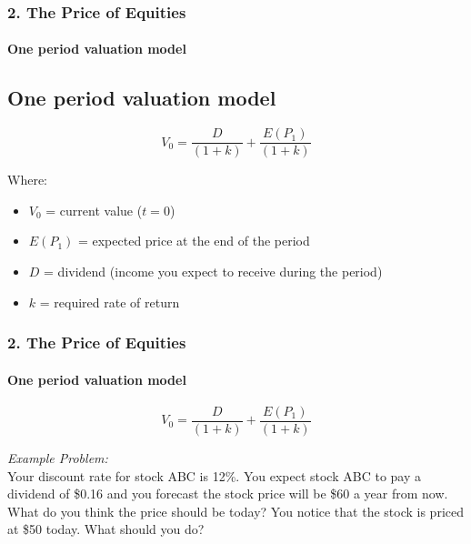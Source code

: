 \documentclass{beamer}
\begin{document}
\begin{frame}[t]
    \frametitle{2. The Price of Equities}
    \framesubtitle{One period valuation model}
    \subsection{One period valuation model}

    $$
    V_0 = \frac{D}{(1+k)} + \frac{E(P_1)}{(1+k)}
    $$

    Where:
    \begin{itemize}
        \item $V_0$ = current value ($t=0$)
        \item $E(P_1)$ = expected price at the end of the period
        \item $D$ = dividend (income you expect to receive during the period)
        \item $k$ = required rate of return
    \end{itemize}

\end{frame}

\begin{frame}[t]
    \frametitle{2. The Price of Equities}
    \framesubtitle{One period valuation model}

    $$
    V_0 = \frac{D}{(1+k)} + \frac{E(P_1)}{(1+k)}
    $$
    \vspace{1em}

    \textit{Example Problem:}\\
    
    Your discount rate for stock ABC is 12\%.   You expect stock ABC to pay a dividend of \$0.16 and you forecast the stock price will be \$60 a year from now.   What do you think the price should be today?   You notice that the stock is priced at \$50 today.   What should you do?


\end{frame}
\end{document}
